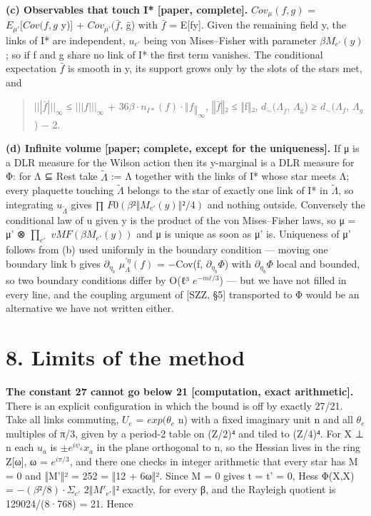 \documentclass[11pt,a4paper]{article}
\theoremstyle{named}
\begin{document}
\textbf{(c) Observables that touch I* [paper, complete].} $Cov_{μ}(f,g)$ = $E_{μ'}[Cov(f,g$ \textbar{} y)] + $Cov_{μ'}(\bar{f}$, ḡ) with $\bar{f}$ = E[f\textbar{}y]. Given the remaining field y, the links of I* are independent, $u_{e'}$ being von Mises–Fisher with parameter $βM_{e'}(y)$; so if f and g share no link of I* the first term vanishes. The conditional expectation $\bar{f}$ is smooth in y, its support grows only by the slots of the stars met, and

\begin{quote}
$|||\bar{f}|||_{∞}$ ≤ $|||f|||_{∞}$ + $36β·n_{I*}(f)·‖f‖_{∞}$,  $‖\bar{f}‖₂$ ≤ ‖f‖₂,  $d_{∼}(Λ_{\bar{f}}$, $Λ_{ḡ}$) ≥ $d_{∼}(Λ_f$, $Λ_g$) − 2.
\end{quote}
\textbf{(d) Infinite volume [paper; complete, except for the uniqueness].} If μ is a DLR measure for the Wilson action then its y-marginal is a DLR measure for Φ: for Λ ⊆ Rest take $\tilde{Λ}$ := Λ together with the links of I* whose star meets Λ; every plaquette touching $\tilde{Λ}$ belongs to the star of exactly one link of I* in $\tilde{Λ}$, so integrating $u_{\tilde{Λ}}$ gives ∏ $F0(β²‖M_{e'}(y)‖²/4)$ and nothing outside. Conversely the conditional law of u given y is the product of the von Mises–Fisher laws, so μ = μ' ⊗ $∏_{e'}$ $vMF(βM_{e'}(y))$ and μ is unique as soon as μ' is. Uniqueness of μ' follows from (b) used uniformly in the boundary condition — moving one boundary link b gives $∂_{η_b}$ $μ^{\prime η}_{Λ}(f)$ = −Cov(f, $∂_{η_b}Φ$) with $∂_{η_b}Φ$ local and bounded, so two boundary conditions differ by O(ℓ³ $e^{−mℓ/3}$) — but we have not filled in every line, and the coupling argument of [SZZ, §5] transported to Φ would be an alternative we have not written either.

\section*{8. Limits of the method}
\textbf{The constant 27 cannot go below 21 [computation, exact arithmetic].} There is an explicit configuration in which the bound is off by exactly 27/21. Take all links commuting, $U_e$ = $exp(θ_e$ n) with a fixed imaginary unit n and all $θ_e$ multiples of π/3, given by a period-2 table on (Z/2)⁴ and tiled to (Z/4)⁴. For X ⊥ n each $u_a$ is $±e^{iψ_a}x_a$ in the plane orthogonal to n, so the Hessian lives in the ring Z[ω], ω = $e^{iπ/3}$, and there one checks in integer arithmetic that every star has M = 0 and ‖M'‖² = 252 = ‖12 + 6ω‖². Since M = 0 gives t = t' = 0, Hess Φ(X,X) = $−(β²/8)·Σ_{e'}$ $2‖M'_{e'}‖²$ exactly, for every β, and the Rayleigh quotient is 129024/(8·768) = 21. Hence
\end{document}
